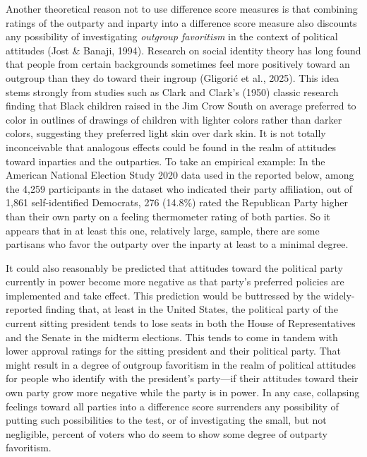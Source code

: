 \documentclass[authordate, meta]{jote-new-article}
\begin{document}
	Another theoretical reason not to use difference score measures is that combining ratings of the outparty and inparty into a difference score measure also discounts any possibility of investigating \emph{outgroup favoritism} in the context of political attitudes (Jost \& Banaji, 1994). Research on social identity theory has long found that people from certain backgrounds sometimes feel more positively toward an outgroup than they do toward their ingroup (Gligorić et al., 2025). This idea stems strongly from studies such as Clark and Clark's (1950) classic research finding that Black children raised in the Jim Crow South on average preferred to color in outlines of drawings of children with lighter colors rather than darker colors, suggesting they preferred light skin over dark skin. It is not totally inconceivable that analogous effects could be found in the realm of attitudes toward inparties and the outparties. To take an empirical example: In the American National Election Study 2020 data used in the reported below, among the 4,259 participants in the dataset who indicated their party affiliation, out of 1,861 self-identified Democrats, 276 (14.8\%) rated the Republican Party higher than their own party on a feeling thermometer rating of both parties. So it appears that in at least this one, relatively large, sample, there are some partisans who favor the outparty over the inparty at least to a minimal degree.



	It could also reasonably be predicted that attitudes toward the political party currently in power become more negative as that party's preferred policies are implemented and take effect. This prediction would be buttressed by the widely-reported finding that, at least in the United States, the political party of the current sitting president tends to lose seats in both the House of Representatives and the Senate in the midterm elections. This tends to come in tandem with lower approval ratings for the sitting president and their political party. That might result in a degree of outgroup favoritism in the realm of political attitudes for people who identify with the president's party—if their attitudes toward their own party grow more negative while the party is in power. In any case, collapsing feelings toward all parties into a difference score surrenders any possibility of putting such possibilities to the test, or of investigating the small, but not negligible, percent of voters who do seem to show some degree of outparty favoritism.
\end{document}

